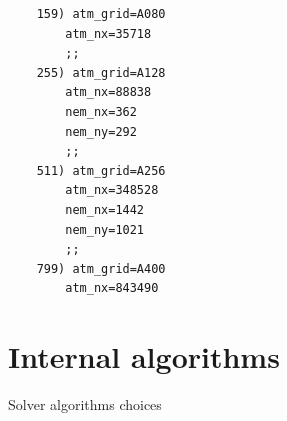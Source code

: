 \begin{lstlisting}
    159) atm_grid=A080
        atm_nx=35718
        ;;
    255) atm_grid=A128
        atm_nx=88838
        nem_nx=362
        nem_ny=292
        ;;
    511) atm_grid=A256
        atm_nx=348528
        nem_nx=1442
        nem_ny=1021
        ;;
    799) atm_grid=A400
        atm_nx=843490  
\end{lstlisting}








\section{Internal algorithms}
Solver algorithms choices

